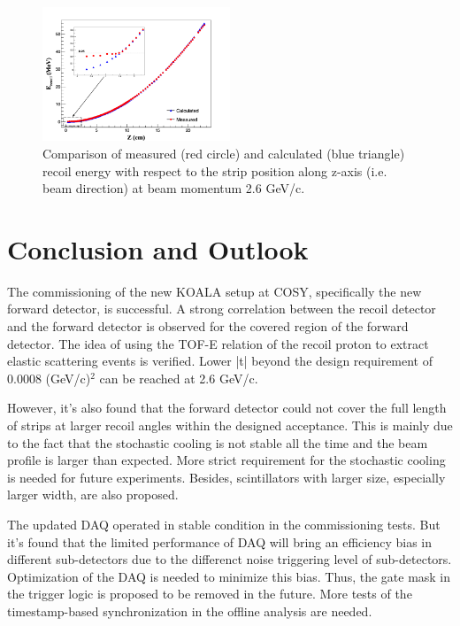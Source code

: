 \documentclass[number,5p]{elsarticle}
\begin{document}
\begin{figure}[htbp]
  \centering
  \includegraphics[width=0.5\textwidth]{./calc_vs_measured_combined.png}
  \caption{
    Comparison of measured (red circle) and calculated (blue triangle) recoil energy with respect to the strip position along z-axis (i.e. beam direction) at beam momentum 2.6 GeV/c.}
  \label{fig:measured_vs_calculated}
\end{figure}


\section{Conclusion and Outlook}
\label{sec:conclusion}

The commissioning of the new KOALA setup at COSY, specifically the new forward detector, is successful.
A strong correlation between the recoil detector and the forward detector is
observed for the covered region of the forward detector.
The idea of using the TOF-E relation of the recoil proton to extract elastic
scattering events is verified.
Lower |t| beyond the design requirement of 0.0008 (GeV/c)$^2$ can be reached at 2.6 GeV/c. 

However, it's also found that the forward detector could not cover the full
length of strips at larger recoil angles within the designed acceptance.
This is mainly due to the fact that the stochastic cooling is not stable all the time
and the beam profile is larger than expected.
More strict requirement for the stochastic cooling is needed for future experiments.
Besides, scintillators with larger size, especially larger width, are also proposed.

The updated DAQ operated in stable condition in the commissioning tests.
But it's found that the limited performance of DAQ will bring an efficiency bias in different
sub-detectors due to the differenct noise triggering level of sub-detectors.
Optimization of the DAQ is needed to minimize this bias.
Thus, the gate mask in the trigger logic is proposed to be removed in the future.
More tests of the timestamp-based synchronization in the offline analysis are needed.



\end{document}
